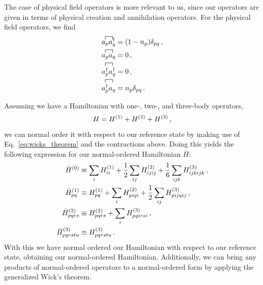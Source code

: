 The case of physical field operators is more relevant to us,
since our operators are given in terms of physical creation and annihilation operators.
For the physical field operators, we find
\begin{align}
  \acontraction{}{\annih{p}}{}{\crea{q}} \annih{p}\crea{q}   & = (1 - n_p) \delta_{pq}\,, \\
  \acontraction{}{\annih{p}}{}{\annih{q}} \annih{p}\annih{q} & = 0\,,                     \\
  \acontraction{}{\crea{p}}{}{\crea{q}} \crea{p}\crea{q}     & = 0\,,                     \\
  \acontraction{}{\crea{p}}{}{\annih{q}} \crea{p}\annih{q}   & = n_p \delta_{pq}\,.
\end{align}

Assuming we have a Hamiltonian with one-, two-, and three-body operators,
\begin{equation}\label{eq:standard_threebody_free_hamiltonian}
  H = {H}^{(1)} + {H}^{(2)} + {H}^{(3)}\,,
\end{equation}
we can normal order it with respect to our reference state
by making use of Eq.~\eqref{eq:wicks_theorem} and the contractions above.
Doing this yields the following expression for our normal-ordered Hamiltonian $\bar{H}$:
\begin{align}
  {\bar{H}}^{(0)}           & \equiv \sum_i {H}^{(1)}_{ii} + \frac{1}{2}\sum_{ij} {H}^{(2)}_{ijij} + \frac{1}{6} \sum_{ijk} {H}^{(3)}_{ijkijk}\,, \\
  {\bar{H}}^{(1)}_{pq}       & \equiv {H}^{(1)}_{pq} + \sum_i {H}^{(2)}_{piqi} + \frac{1}{2} \sum_{ij} {H}^{(3)}_{pijqij} \,,                      \\
  {\bar{H}}^{(2)}_{pqrs}     & \equiv {H}^{(2)}_{pqrs} + \sum_i {H}^{(3)}_{pqirsi} \,,                                                                 \\
  {\bar{H}}^{(3)}_{pqrstu} & \equiv {H}^{(3)}_{pqrstu} \,.
\end{align}
With this we have normal ordered our Hamiltonian with respect to our reference state,
obtaining our normal-ordered Hamiltonian.
Additionally, we can bring any products of normal-ordered operators to a normal-ordered form
by applying the generalized Wick's theorem.

